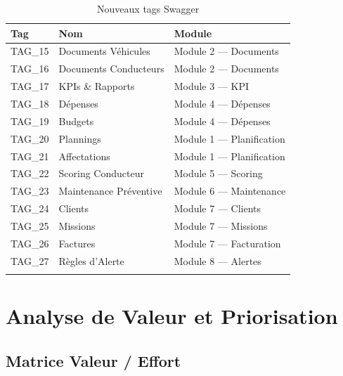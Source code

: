 \documentclass[12pt,a4paper]{report}
\begin{document}
\begin{longtable}{p{2cm}p{5cm}p{6cm}}
\toprule
\textbf{Tag} & \textbf{Nom} & \textbf{Module} \\
\midrule
\endhead
TAG\_15 & Documents Véhicules & Module 2 — Documents \\
TAG\_16 & Documents Conducteurs & Module 2 — Documents \\
TAG\_17 & KPIs \& Rapports & Module 3 — KPI \\
TAG\_18 & Dépenses & Module 4 — Dépenses \\
TAG\_19 & Budgets & Module 4 — Dépenses \\
TAG\_20 & Plannings & Module 1 — Planification \\
TAG\_21 & Affectations & Module 1 — Planification \\
TAG\_22 & Scoring Conducteur & Module 5 — Scoring \\
TAG\_23 & Maintenance Préventive & Module 6 — Maintenance \\
TAG\_24 & Clients & Module 7 — Clients \\
TAG\_25 & Missions & Module 7 — Missions \\
TAG\_26 & Factures & Module 7 — Facturation \\
TAG\_27 & Règles d'Alerte & Module 8 — Alertes \\
\bottomrule
\caption{Nouveaux tags Swagger}
\end{longtable}

\chapter{Analyse de Valeur et Priorisation}

\section{Matrice Valeur / Effort}
\end{document}
